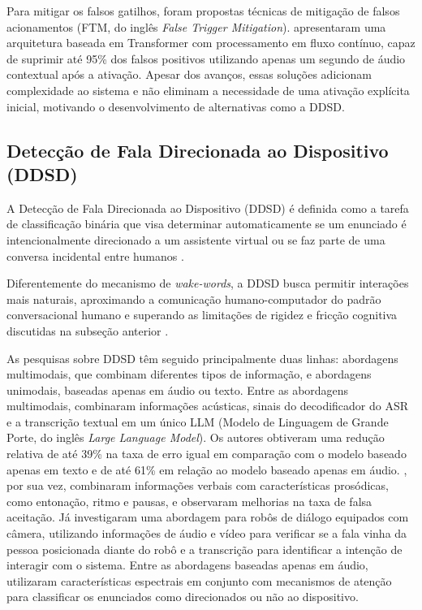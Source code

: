 \documentclass[
    12pt,                %
    openright,           %
    oneside,             %
    a4paper,             %
    english,             %
    brazil               %
]{abntex2}
\begin{document}
Para mitigar os falsos gatilhos, foram propostas técnicas de mitigação de falsos acionamentos (FTM, do inglês \textit{False Trigger Mitigation}).  apresentaram uma arquitetura baseada em Transformer com processamento em fluxo contínuo, capaz de suprimir até 95\% dos falsos positivos utilizando apenas um segundo de áudio contextual após a ativação. Apesar dos avanços, essas soluções adicionam complexidade ao sistema e não eliminam a necessidade de uma ativação explícita inicial, motivando o desenvolvimento de alternativas como a DDSD.


\subsection{Detecção de Fala Direcionada ao Dispositivo (DDSD)}

A Detecção de Fala Direcionada ao Dispositivo (DDSD) é definida como a tarefa de classificação binária que visa determinar automaticamente se um enunciado é intencionalmente direcionado a um assistente virtual ou se faz parte de uma conversa incidental entre humanos \cite{Mallidi2018, Wagner2024}.

Diferentemente do mecanismo de \textit{wake-words}, a DDSD busca permitir interações mais naturais, aproximando a comunicação humano-computador do padrão conversacional humano e superando as limitações de rigidez e fricção cognitiva discutidas na subseção anterior \cite{Nie2021}.

As pesquisas sobre DDSD têm seguido principalmente duas linhas: abordagens multimodais, que combinam diferentes tipos de informação, e abordagens unimodais, baseadas apenas em áudio ou texto. Entre as abordagens multimodais,  combinaram informações acústicas, sinais do decodificador do ASR e a transcrição textual em um único LLM (Modelo de Linguagem de Grande Porte, do inglês \textit{Large Language Model}). Os autores obtiveram uma redução relativa de até 39\% na taxa de erro igual em comparação com o modelo baseado apenas em texto e de até 61\% em relação ao modelo baseado apenas em áudio. , por sua vez, combinaram informações verbais com características prosódicas, como entonação, ritmo e pausas, e observaram melhorias na taxa de falsa aceitação. Já  investigaram uma abordagem para robôs de diálogo equipados com câmera, utilizando informações de áudio e vídeo para verificar se a fala vinha da pessoa posicionada diante do robô e a transcrição para identificar a intenção de interagir com o sistema. Entre as abordagens baseadas apenas em áudio,  utilizaram características espectrais em conjunto com mecanismos de atenção para classificar os enunciados como direcionados ou não ao dispositivo.
\end{document}
